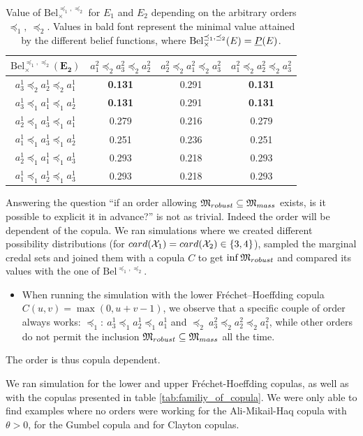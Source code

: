 \begin{example}
\begin{table}[!ht]
\begin{tabular}{|c||c|c|c|}
\hline
$\mathrm{Bel}^{\preceq_1,\preceq_2}_\times(\mathbf{E_2})$ & $a^2_1\preceq_2a^2_3\preceq_2a^2_2$ & $a^2_2\preceq_2a^2_1\preceq_2a^2_3$ & $a^2_1\preceq_2a^2_2\preceq_2a^2_3$ \\ \hline\hline
$a^1_3\preceq_2a^1_2\preceq_2a^1_1$ & \textbf{0.131} & 0.291 & \textbf{0.131} \\ \hline
$a^1_3\preceq_1a^1_1\preceq_1a^1_2$ & \textbf{0.131} & 0.291 & \textbf{0.131} \\ \hline
$a^1_2\preceq_1a^1_3\preceq_1a^1_1$ & 0.279 & 0.216 & 0.279 \\ \hline
$a^1_1\preceq_1a^1_3\preceq_1a^1_2$ & 0.251 & 0.236 & 0.251 \\ \hline
$a^1_2\preceq_1a^1_1\preceq_1a^1_3$ & 0.293 & 0.218 & 0.293 \\ \hline
$a^1_1\preceq_1a^1_2\preceq_1a^1_3$ & 0.293 & 0.218 & 0.293 \\ \hline
\end{tabular}

\caption{Value of $\mathrm{Bel}^{\preceq_1,\preceq_2}_\times$ for $E_1$ and $E_2$ depending on the arbitrary orders $\preceq_1,~\preceq_2$. Values in bald font represent the minimal value attained by the different belief functions, where $\mathrm{Bel}^{\preceq_1,\preceq_2}_\times(E)={\underline{P}}(E)$.}
\label{tab:beliefs_orders}
\end{table}

Answering the question ``if an order allowing ${\mathfrak{M}}_{robust}\subseteq{\mathfrak{M}}_{mass}$ exists, is it possible to explicit it in advance?'' is not as trivial. Indeed the order will be dependent of the copula. We ran simulations where we created different possibility distributions (for $card({\mathcal{X}}_1)=card({\mathcal{X}}_2)\in\{3,4\}$), sampled the marginal credal sets and joined them with a copula $C$ to get $\inf{\mathfrak{M}}_{robust}$ and compared its values with the one of $\mathrm{Bel}^{\preceq_1,\preceq_2}$.
\begin{itemize}
	\item When running the simulation with the lower Fréchet–Hoeffding copula $C(u,v)=\max(0,u+v-1)$, we observe that a specific couple of order always works: $\preceq_1:~a^1_3\preceq_1a^1_2\preceq_1a^1_1$ and $\preceq_2~a^2_3\preceq_2a^2_2\preceq_2a^2_1$, while other orders do not permit the inclusion ${\mathfrak{M}}_{robust}\subseteq{\mathfrak{M}}_{mass}$ all the time.
\end{itemize}
The order is thus copula dependent.

We ran simulation for the lower and upper Fréchet-Hoeffding copulas, as well as with the copulas presented in table \ref{tab:familiy_of_copula}. We were only able to find examples where no orders were working for the Ali-Mikail-Haq copula with $\theta>0$, for the Gumbel copula and for Clayton copulas. 
\end{example}

\pagebreak